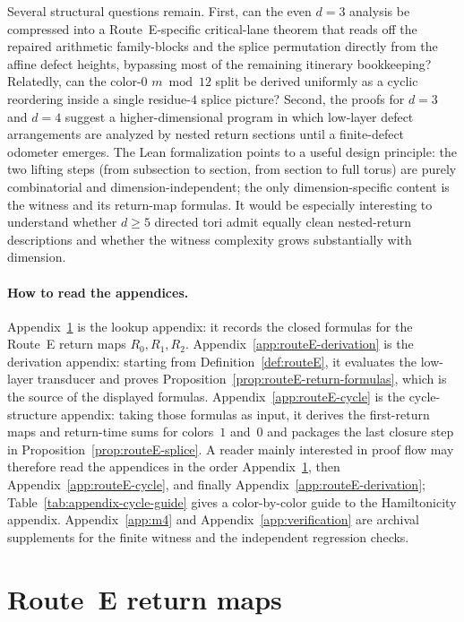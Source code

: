 \documentclass[11pt]{article}
\begin{document}
Several structural questions remain.
First, can the even $d=3$ analysis be compressed into a Route~E-specific critical-lane theorem that reads off the repaired arithmetic family-blocks and the splice permutation directly from the affine defect heights, bypassing most of the remaining itinerary bookkeeping?
Relatedly, can the color-$0$ $m\bmod 12$ split be derived uniformly as a cyclic reordering inside a single residue-$4$ splice picture?
Second, the proofs for $d=3$ and $d=4$ suggest a higher-dimensional program in which low-layer defect arrangements are analyzed by nested return sections until a finite-defect odometer emerges.
The Lean formalization points to a useful design principle: the two lifting steps (from subsection to section, from section to full torus) are purely combinatorial and dimension-independent; the only dimension-specific content is the witness and its return-map formulas.
It would be especially interesting to understand whether $d\ge 5$ directed tori admit equally clean nested-return descriptions and whether the witness complexity grows substantially with dimension.

\appendix

\paragraph{How to read the appendices.}
Appendix~\ref{app:routeE} is the lookup appendix: it records the closed formulas for the Route~E return maps $R_0,R_1,R_2$.
Appendix~\ref{app:routeE-derivation} is the derivation appendix: starting from Definition~\ref{def:routeE}, it evaluates the low-layer transducer and proves Proposition~\ref{prop:routeE-return-formulas}, which is the source of the displayed formulas.
Appendix~\ref{app:routeE-cycle} is the cycle-structure appendix: taking those formulas as input, it derives the first-return maps and return-time sums for colors~$1$ and~$0$ and packages the last closure step in Proposition~\ref{prop:routeE-splice}.
A reader mainly interested in proof flow may therefore read the appendices in the order Appendix~\ref{app:routeE}, then Appendix~\ref{app:routeE-cycle}, and finally Appendix~\ref{app:routeE-derivation}; Table~\ref{tab:appendix-cycle-guide} gives a color-by-color guide to the Hamiltonicity appendix.
Appendix~\ref{app:m4} and Appendix~\ref{app:verification} are archival supplements for the finite witness and the independent regression checks.
\section{Route~E return maps}\label{app:routeE}
\end{document}
